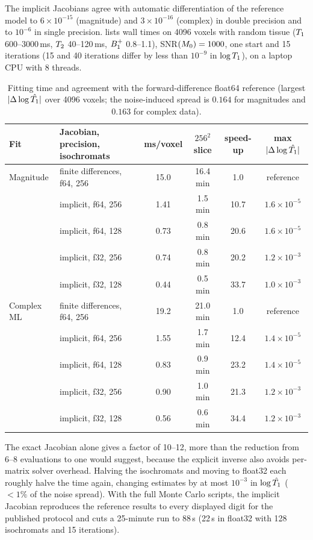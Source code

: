 The implicit Jacobians agree with automatic differentiation of the reference model to
$6\times10^{-15}$ (magnitude) and $3\times10^{-16}$ (complex) in double precision and to $10^{-6}$ in single
precision.  lists wall times on 4096 voxels with random tissue
($T_1$ 600--3000\,ms, $T_2$ 40--120\,ms, $B_1^{+}$ 0.8--1.1), SNR$(M_0)=1000$, one start and 15
iterations (15 and 40 iterations differ by less than $10^{-9}$ in $\log T_1$), on a laptop CPU with 8
threads.

\begin{table}[!htbp]
\centering
\caption{Fitting time and agreement with the forward-difference float64 reference (largest
$|\Delta\log\hat{T_1}|$ over 4096 voxels; the noise-induced spread is $0.164$ for magnitudes and $0.163$ for
complex data).}
\label{tab:bench}
\small
\begin{tabular}{llcccc}
\toprule
Fit & Jacobian, precision, isochromats & ms/voxel & $256^2$ slice & speed-up & max $|\Delta\log\hat{T_1}|$\\
\midrule
Magnitude & finite differences, f64, 256 & 15.0 & 16.4 min & 1.0 & reference\\
 & implicit, f64, 256 & 1.41 & 1.5 min & 10.7 & $1.6\times10^{-5}$\\
 & implicit, f64, 128 & 0.73 & 0.8 min & 20.6 & $1.6\times10^{-5}$\\
 & implicit, f32, 256 & 0.74 & 0.8 min & 20.2 & $1.2\times10^{-3}$\\
 & implicit, f32, 128 & 0.44 & 0.5 min & 33.7 & $1.0\times10^{-3}$\\
\midrule
Complex ML & finite differences, f64, 256 & 19.2 & 21.0 min & 1.0 & reference\\
 & implicit, f64, 256 & 1.55 & 1.7 min & 12.4 & $1.4\times10^{-5}$\\
 & implicit, f64, 128 & 0.83 & 0.9 min & 23.2 & $1.4\times10^{-5}$\\
 & implicit, f32, 256 & 0.90 & 1.0 min & 21.3 & $1.2\times10^{-3}$\\
 & implicit, f32, 128 & 0.56 & 0.6 min & 34.4 & $1.2\times10^{-3}$\\
\bottomrule
\end{tabular}
\end{table}

The exact Jacobian alone gives a factor of 10--12, more than the reduction from 6--8
evaluations to one would suggest, because the explicit inverse also avoids per-matrix solver
overhead. Halving the isochromats and moving to float32 each roughly halve the time again,
changing estimates by at most $10^{-3}$ in $\log\hat{T_1}$ ($<1\%$ of the noise spread). With the full
Monte Carlo scripts, the implicit Jacobian reproduces the reference results to every
displayed digit for the published protocol and cuts a 25-minute run to 88\,s (22\,s in float32
with 128 isochromats and 15 iterations).

